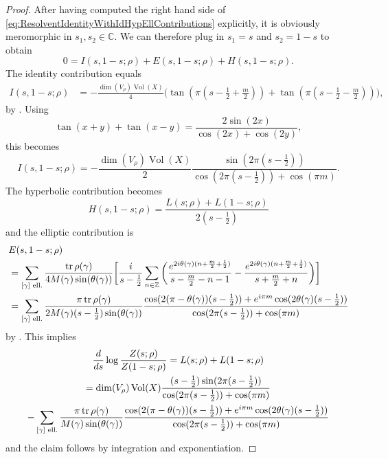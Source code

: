 \documentclass[10pt]{amsart}
\theoremstyle{plain}
\theoremstyle{definition}
\theoremstyle{remark}
\newcommand{\Z}{\mathbb{Z}}
\newcommand{\C}{\mathbb{C}}
\DeclareMathOperator{\tr}{tr}
\DeclareMathOperator{\Vol}{Vol}
\numberwithin{equation}{section}
\begin{document}
\begin{proof}
After having computed the right hand side of \cref{eq:ResolventIdentityWithIdHypEllContributions} explicitly, it is obviously meromorphic in $s_1,s_2\in\C$. We can therefore plug in $s_1=s$ and $s_2=1-s$ to obtain
\[
0 = I(s,1-s;\rho)+E(s,1-s;\rho)+H(s,1-s;\rho).
\]
The identity contribution equals
\begin{align*}
I(s,1-s;\rho) &= -\frac{\dim(V_\rho)\Vol(X)}{4}\big(\tan(\pi(s-\tfrac{1}{2}+\tfrac{m}{2}))+\tan(\pi(s-\tfrac{1}{2}-\tfrac{m}{2}))\big),
\end{align*}
by \cite[proof of Th.\,4.2.8]{FS}. Using
\begin{equation*}
\tan(x+y)+\tan(x-y) = \frac{2\sin(2x)}{\cos(2x)+\cos(2y)},\label{eq:TangentIdentity}
\end{equation*}
this becomes
\[
I(s,1-s;\rho) = -\frac{\dim(V_\rho)\Vol(X)}{2}\frac{\sin(2\pi(s-\frac{1}{2}))}{\cos(2\pi(s-\frac{1}{2}))+\cos(\pi m)}.
\]
The hyperbolic contribution becomes
\[
H(s,1-s;\rho) = \frac{L(s;\rho)+L(1-s;\rho)}{2(s-\frac{1}{2})}
\]
and the elliptic contribution is
\begin{align*}
& E(s,1-s;\rho)\\
& =\sum_{[\gamma]\textup{ ell.}} \frac{\tr\rho(\gamma)}{4M(\gamma)\sin(\theta(\gamma))}\bigg[\frac{i}{s-\frac{1}{2}}\sum_{n\in\Z}\bigg(\frac{e^{2i\theta(\gamma)(n+\frac{m}{2}+\frac{1}{2})}}{s-\frac{m}{2}-n-1}-\frac{e^{2i\theta(\gamma)(n+\frac{m}{2}+\frac{1}{2})}}{s+\frac{m}{2}+n}\bigg)\bigg]\\
& =\sum_{[\gamma]\textup{ ell.}} \frac{\pi\tr\rho(\gamma)}{2M(\gamma)(s-\frac{1}{2})\sin(\theta(\gamma))}\frac{\cos(2(\pi-\theta(\gamma))(s-\frac{1}{2}))+e^{i\pi m}\cos(2\theta(\gamma)(s-\frac{1}{2}))}{\cos(2\pi(s-\frac{1}{2}))+\cos(\pi m)}
\end{align*}
by \cite[Eq.\,(**) on p.\,444]{He2}.
This implies
\begin{multline}
\label{eq:logeta}
\frac{d}{ds}\log\frac{Z(s;\rho)}{Z(1-s;\rho)} = L(s;\rho)+L(1-s;\rho)\\
= \dim(V_\rho)\Vol(X)\frac{(s-\frac{1}{2})\sin(2\pi(s-\frac{1}{2}))}{\cos(2\pi(s-\frac{1}{2}))+\cos(\pi m)}\\
- \sum_{[\gamma]\textup{ ell.}}\frac{\pi\tr\rho(\gamma)}{M(\gamma)\sin(\theta(\gamma))}\frac{\cos(2(\pi-\theta(\gamma))(s-\frac{1}{2}))+e^{i\pi m}\cos(2\theta(\gamma)(s-\frac{1}{2}))}{\cos(2\pi(s-\frac{1}{2}))+\cos(\pi m)}
\end{multline}
and the claim follows by integration and exponentiation.
\end{proof}
\end{document}
